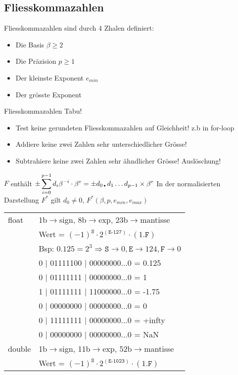 \subsection{Fliesskommazahlen}
Fliesskommazahlen sind durch 4 Zhalen definiert:
\begin{itemize}
	\item Die Basis $\beta \geqslant 2$
	\item Die Präzision $p \geqslant 1$
	\item Der kleinste Exponent $e_{min}$
	\item Der grösste Exponent	
\end{itemize}
Fliesskommazahlen Tabu!
\begin{itemize}
	\item Test keine gerundeten Fliesskommazahlen auf Gleichheit! z.b in for-loop
	\item Addiere keine zwei Zahlen  sehr unterschiedlicher Grösse! 
	\item Subtrahiere keine zwei Zahlen sehr ähndlicher Grösse! Auslöschung!

\end{itemize}
$F$ enthält $\displaystyle \pm\sum_{i=0}^{p-1}d_i \beta^{-i}\cdot \beta^{e} =  \pm d_{0\text{\textbullet}} d_1\dots d_{p-1} \times \beta^e$
In der normalisierten Darstellung $F^{\ast}$ gilt $d_0 \neq 0$, $F^{\ast}(\beta,p,e_{min},e_{max})$ 
\begin{center}
	\begin{tabular}{ ll } 
		float&1b$\rightarrow$sign, 8b$\rightarrow$exp, 23b$\rightarrow$mantisse\\
		&Wert = $(-1)^{\texttt{S}} \cdot 2^{(\texttt{E-127})} \cdot (1.\texttt{F})$\\
		&Bsp: $0.125 = 2^{3} \Rightarrow \texttt{S} \rightarrow 0, \texttt{E} \rightarrow 124, \texttt{F} \rightarrow 0$\\
		\hline
		 & 0 | 01111100 | 00000000...0 = 0.125\\
		 & 0 | 01111111 | 00000000...0 = 1\\
		 & 1 | 01111111 | 11000000...0 = -1.75\\
		 & 0 | 00000000 | 00000000...0 = 0\\
		 & 0 | 11111111 | 00000000...0 = +infty\\
		 & 0 | 00000000 | 00000000...0 = NaN\\
		\hline
		double& 1b$\rightarrow$sign, 11b$\rightarrow$exp, 52b$\rightarrow$mantisse\\
		& Wert = $(-1)^{\texttt{S}} \cdot 2^{(\texttt{E-1023})} \cdot (1.\texttt{F})$\\
	\end{tabular}
\end{center}















